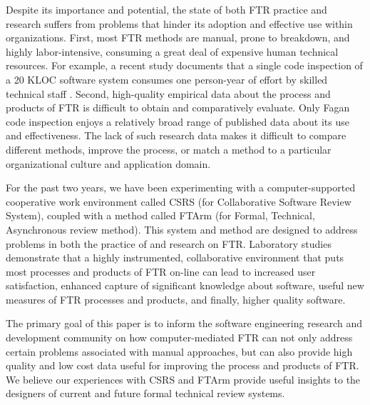 Despite its importance and potential, the state of both FTR practice and
research suffers from problems that hinder its adoption and effective use
within organizations.  First, most FTR methods are manual, prone to
breakdown, and highly labor-intensive, consuming a great deal of expensive
human technical resources. For example, a recent study documents that a
single code inspection of a 20 KLOC software system consumes one
person-year of effort by skilled technical staff \cite{Russell91}.  Second,
high-quality empirical data about the process and products of FTR is
difficult to obtain and comparatively evaluate.  Only Fagan code inspection
enjoys a relatively broad range of published data about its use and
effectiveness.  The lack of such research data makes it difficult to
compare different methods, improve the process, or match a method to a
particular organizational culture and application domain.

For the past two years, we have been experimenting with a
computer-supported cooperative work environment called CSRS (for
Collaborative Software Review System), coupled with a method called FTArm
(for Formal, Technical, Asynchronous review method). This system and method
are designed to address problems in both the practice of and research on
FTR.  Laboratory studies demonstrate that a highly instrumented,
collaborative environment that puts most processes and products of FTR
on-line can lead to increased user satisfaction, enhanced capture of
significant knowledge about software, useful new measures of FTR processes
and products, and finally, higher quality software.

The primary goal of this paper is to inform the software engineering
research and development community on how computer-mediated FTR can not
only address certain problems associated with manual approaches, but can
also provide high quality and low cost data useful for improving the
process and products of FTR.  We believe our experiences with CSRS and
FTArm provide useful insights to the designers of current and future formal
technical review systems.







 


